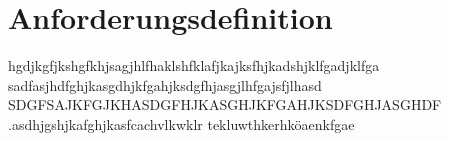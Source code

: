 \chapter{Anforderungsdefinition}
hgdjkgfjkshgfkhjsagjhlfhaklshfklafjkajksfhjkadshjklfgadjklfga
sadfasjhdfghjkasgdhjkfgahjksdgfhjasgjlhfgajsfjlhasd
SDGFSAJKFGJKHASDGFHJKASGHJKFGAHJKSDFGHJASGHDF
.asdhjgshjkafghjkasfcachvlkwklr tekluwthkerhköaenkfgae